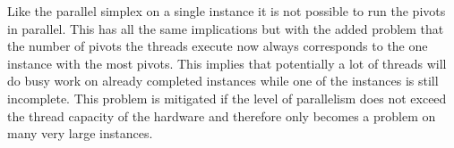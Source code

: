 Like the parallel simplex on a single instance it is not possible to run the pivots in parallel. This has all the same implications but with the added problem that the number of pivots the threads execute now always corresponds to the one instance with the most pivots. This implies that potentially a lot of threads will do busy work on already completed instances while one of the instances is still incomplete. This problem is mitigated if the level of parallelism does not exceed the thread capacity of the hardware and therefore only becomes a problem on many very large instances.
